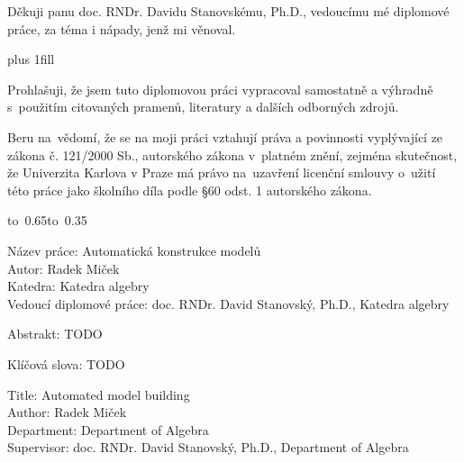 \documentclass{cs-dipl}
\begin{document}
\normalsize

\newpage

\renewcommand\thepage{Podekovani}

\vspace*{10mm}

\noindent
Děkuji panu doc. RNDr. Davidu Stanovskému, Ph.D., vedoucímu mé diplomové
práce, za téma i nápady, jenž mi věnoval.

\vfill

\newpage

\renewcommand\thepage{Cestne prohlaseni}


\vglue 0pt plus 1fill

\noindent
Prohlašuji, že jsem tuto diplomovou práci vypracoval samostatně a výhradně
s~použitím citovaných pramenů, literatury a dalších odborných zdrojů.

\medskip\noindent
Beru na~vědomí, že se na moji práci vztahují práva a povinnosti vyplývající
ze zákona č. 121/2000 Sb., autorského zákona v~platném znění, zejména
skutečnost, že Univerzita Karlova v Praze má právo na~uzavření licenční
smlouvy o~užití této práce jako školního díla podle §60 odst. 1 autorského
zákona.

\vspace{10mm}

\hbox{\hbox to 0.65\hbox to 0.35}

\vspace{20mm}

\newpage

\renewcommand\thepage{Abstrakt}

\noindent
Název práce: Automatická konstrukce modelů\\
Autor: Radek Miček\\
Katedra: Katedra algebry\\
Vedoucí diplomové práce: doc. RNDr. David Stanovský, Ph.D., Katedra algebry

\bigskipamount

\noindent Abstrakt:
TODO

\bigskip

\noindent Klíčová slova: TODO

\bigskipamount

\noindent
Title: Automated model building\\
Author: Radek Miček\\
Department: Department of Algebra\\
Supervisor: doc. RNDr. David Stanovský, Ph.D., Department of Algebra
\end{document}
